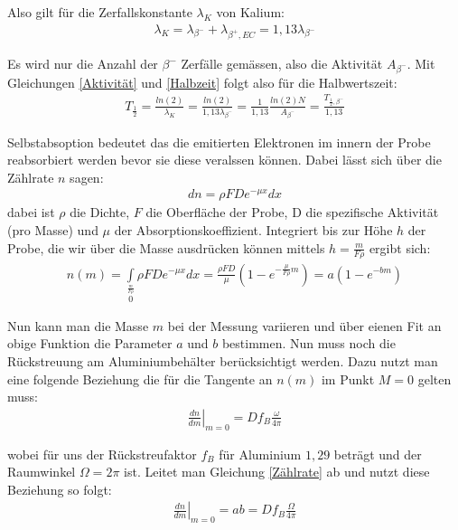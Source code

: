 \documentclass[12pt]{article}
\begin{document}
Also gilt für die Zerfallskonstante $\lambda_K$ von Kalium:
\begin{align}
 \lambda_K=\lambda_{\beta^-} + \lambda_{\beta^+,EC}=1,13\lambda_{\beta^-}
\end{align}

Es wird nur die Anzahl der $\beta^-$ Zerfälle gemässen, also die Aktivität $A_{\beta^-}$. Mit Gleichungen \ref{Aktivität} und \ref{Halbzeit} folgt also für die Halbwertszeit:
\begin{align}
\label{zeit} T_{\frac{1}{2}} = \frac{ln(2)}{\lambda_K} = \frac{ln(2)}{1,13 \lambda_{\beta^-}} = \frac{1}{1,13} \frac{ln(2) N}{A_{\beta^-}} = \frac{T_{\frac{1}{2}, \beta^-}}{1,13}
\end{align}

Selbstabsoption bedeutet das die emitierten Elektronen im innern der Probe reabsorbiert werden bevor sie diese veralssen können. Dabei lässt sich über die Zählrate $n$ sagen:
\begin{align}
 dn=\rho F D e^{-\mu x} dx
\end{align}
dabei ist $\rho$ die Dichte, $F$ die Oberfläche der Probe, D die spezifische Aktivität (pro Masse) und $\mu$ der Absorptionskoeffizient. Integriert bis zur Höhe $h$ der Probe, die wir über die Masse ausdrücken können mittels $h = \frac{m}{F \rho}$ ergibt sich:
\begin{align}
  \label{zählrate} n(m) = \int \limits_{0} \limits^{\frac{m}{F \rho}} \rho F D e^{-\mu x} dx = \frac{\rho F D}{\mu} \left( 1- e^{-\frac{\mu}{F \rho} m} \right) = a \left( 1 - e^{-bm} \right)
\end{align}

Nun kann man die Masse $m$ bei der Messung variieren und über eienen Fit an obige Funktion die Parameter $a$ und $b$ bestimmen. Nun muss noch die Rückstreuung am Aluminiumbehälter berücksichtigt werden. Dazu nutzt man eine folgende Beziehung die für die Tangente an $n(m)$ im Punkt $M=0$ gelten muss:
\begin{align}
 \left. \frac{dn}{dm}  \right|_{m=0} = D f_B \frac{\omega}{4\pi}
\end{align}

wobei für uns der Rückstreufaktor $f_B$ für Aluminium $1,29$ beträgt und der Raumwinkel $\Omega=2\pi$ ist. Leitet man Gleichung \ref{Zählrate} ab und nutzt diese Beziehung so folgt:
\begin{align}
  \left. \frac{dn}{dm}  \right|_{m=0} = ab =  D f_B \frac{\Omega}{4\pi}
\end{align}
\end{document}
